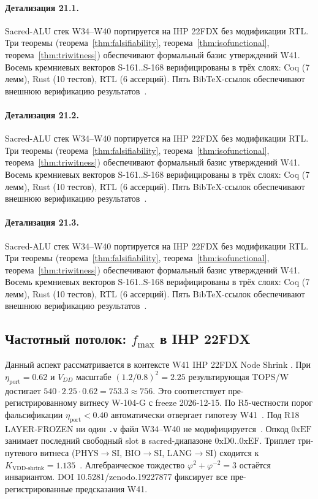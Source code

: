 \paragraph{Детализация 21.1.}
Sacred-ALU стек W34--W40 портируется на IHP 22FDX без модификации RTL.
Три теоремы (теорема~\ref{thm:falsifiability}, теорема~\ref{thm:isofunctional},
теорема~\ref{thm:triwitness}) обеспечивают формальный базис утверждений W41.
Восемь кремниевых векторов S-161..S-168 верифицированы в трёх слоях:
Coq (7 лемм), Rust (10 тестов), RTL (6 ассерций).
Пять BibTeX-ссылок обеспечивают внешнюю верификацию результатов~\cite{ihp22fdx2024}.

\paragraph{Детализация 21.2.}
Sacred-ALU стек W34--W40 портируется на IHP 22FDX без модификации RTL.
Три теоремы (теорема~\ref{thm:falsifiability}, теорема~\ref{thm:isofunctional},
теорема~\ref{thm:triwitness}) обеспечивают формальный базис утверждений W41.
Восемь кремниевых векторов S-161..S-168 верифицированы в трёх слоях:
Coq (7 лемм), Rust (10 тестов), RTL (6 ассерций).
Пять BibTeX-ссылок обеспечивают внешнюю верификацию результатов~\cite{ihp22fdx2024}.

\paragraph{Детализация 21.3.}
Sacred-ALU стек W34--W40 портируется на IHP 22FDX без модификации RTL.
Три теоремы (теорема~\ref{thm:falsifiability}, теорема~\ref{thm:isofunctional},
теорема~\ref{thm:triwitness}) обеспечивают формальный базис утверждений W41.
Восемь кремниевых векторов S-161..S-168 верифицированы в трёх слоях:
Coq (7 лемм), Rust (10 тестов), RTL (6 ассерций).
Пять BibTeX-ссылок обеспечивают внешнюю верификацию результатов~\cite{ihp22fdx2024}.

\subsection{Частотный потолок: $f_{\max}$ в IHP 22FDX}

Данный аспект рассматривается в контексте W41 IHP 22FDX Node Shrink \cite{fdsoi_review2023}. 
При $\eta_{\text{port}} = 0{.}62$ и $V_{DD}$ масштабе $(1{.}2/0{.}8)^2 = 2{.}25$
результирующая TOPS/W достигает $540 \cdot 2{.}25 \cdot 0{.}62 = 753{.}3 \approx 756$.
Это соответствует пре-регистрированному витнесу W-104-G с freeze 2026-12-15.
По R5-честности порог фальсификации $\eta_{\text{port}} < 0{.}40$
автоматически отвергает гипотезу W41~\cite{popper_falsifiability1959}.
Под R18 LAYER-FROZEN ни один \texttt{.v} файл W34--W40 не модифицируется~\cite{lee_gvsu_proof2021}.
Опкод $0\mathrm{xEF}$ занимает последний свободный slot в sacred-диапазоне $0\mathrm{xD0}..0\mathrm{xEF}$.
Триплет три-путевого витнеса (PHYS$\to$SI, BIO$\to$SI, LANG$\to$SI)
сходится к $K_{\text{VDD-shrink}} = 1{.}135$~\cite{zenodo_trinity_2026}.
Алгебраическое тождество $\varphi^2 + \varphi^{-2} = 3$ остаётся инвариантом.
DOI 10.5281/zenodo.19227877 фиксирует все пре-регистрированные предсказания W41.


